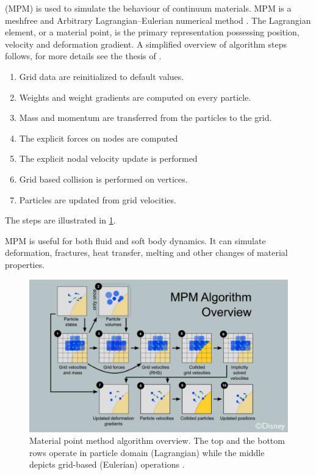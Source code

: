  (MPM) is used to simulate the behaviour of continuum materials. MPM is a meshfree and Arbitrary Lagrangian–Eulerian numerical method \cite{ALE}. The Lagrangian element, or a material point, is the primary representation possessing position, velocity and deformation gradient. A simplified overview of algorithm steps follows, for more details see the thesis of \citet{jiang2015material}.

\begin{enumerate}
    \item Grid data are reinitialized to default values.
    \item Weights and weight gradients are computed on every particle.
    \item Mass and momentum are transferred from the particles to the grid.
    \item The explicit forces on nodes are computed
    \item The explicit nodal velocity update is performed
    \item Grid based collision is performed on vertices.
    \item Particles are updated from grid velocities.
\end{enumerate}
The steps are illustrated in \cref{fig:mpm}.

MPM is useful for both fluid and soft body dynamics. It can simulate deformation, fractures, heat transfer, melting and other changes of material properties.

\begin{figure}
\centering
\includegraphics[width=\textwidth]{img/MPM}
\caption{Material point method algorithm overview. The top and the bottom rows operate in particle domain (Lagrangian) while the middle depicts grid-based (Eulerian) operations \cite{disney}.
}
\label{fig:mpm}
\end{figure}


